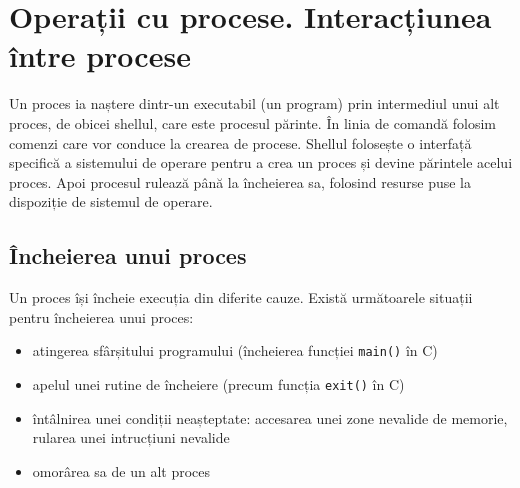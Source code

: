 
\section{Operații cu procese. Interacțiunea între procese}
\label{sec:process:operations}

Un proces ia naștere dintr-un executabil (un program) prin intermediul unui alt proces, de obicei shellul, care este procesul părinte.
În linia de comandă folosim comenzi care vor conduce la crearea de procese.
Shellul folosește o interfață specifică a sistemului de operare pentru a crea un proces și devine părintele acelui proces.
Apoi procesul rulează până la încheierea sa, folosind resurse puse la dispoziție de sistemul de operare.

\subsection{Încheierea unui proces}
\label{sec:process:terminate}

Un proces își încheie execuția din diferite cauze.
Există următoarele situații pentru încheierea unui proces:

\begin{itemize}
  \item atingerea sfârșitului programului (încheierea funcției \texttt{main()} în C)
  \item apelul unei rutine de încheiere (precum funcția \texttt{exit()} în C)
  \item întâlnirea unei condiții neașteptate: accesarea unei zone nevalide de memorie, rularea unei intrucțiuni nevalide
  \item omorârea sa de un alt proces
\end{itemize}

